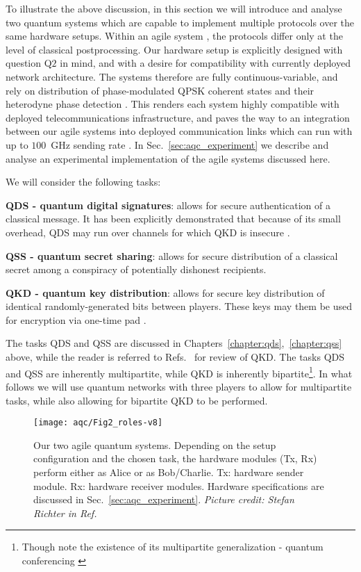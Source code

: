 To illustrate the above discussion, in this section we will introduce and analyse two quantum systems which are capable to implement multiple protocols over the same hardware setups. Within an agile system , the protocols differ only at the level of classical postprocessing. Our hardware setup is explicitly designed with question Q$2$ in mind, and with a desire for compatibility with currently deployed network architecture. The systems therefore are fully continuous-variable, and rely on distribution of phase-modulated QPSK coherent states and their heterodyne phase detection \cite{Agrawal2008}. This renders each system highly compatible with deployed telecommunications infrastructure, and paves the way to an integration between our agile systems into deployed communication links which can run with up to $100$~GHz sending rate \cite{Khan2015, Khan2016}. In Sec.~\ref{sec:aqc_experiment} we describe and analyse an experimental implementation of the agile systems discussed here.

We will consider the following tasks:

\textbf{QDS - quantum digital signatures}: allows for secure authentication of a classical message. It has been explicitly demonstrated that because of its small overhead, QDS may run over channels for which QKD is insecure \cite{Amiri2016}.

\textbf{QSS - quantum secret sharing}: allows for secure distribution of a classical secret among a conspiracy of potentially dishonest recipients.

\textbf{QKD - quantum key distribution}: allows for secure key distribution of identical randomly-generated bits between players. These keys may them be used for encryption via one-time pad \cite{Schneier1996}.

The tasks QDS and QSS are discussed in Chapters~\ref{chapter:qds},~\ref{chapter:qss} above, while the reader is referred to Refs.~\cite{Laudenbach2017, Scarani2009} for review of QKD. The tasks QDS and QSS are inherently multipartite, while QKD is inherently bipartite\footnote{Though note the existence of its multipartite generalization - quantum conferencing \cite{Ottaviani2017b, Ottaviani2019}}. In what follows we will use quantum networks with three players to allow for multipartite tasks, while also allowing for bipartite QKD to be performed.

\begin{figure}[htp]
\captionsetup{width=0.8\linewidth}
\centering
\texttt{[image: aqc/Fig2\_roles-v8]}
\caption{\label{fig:agile_tasks} Our two agile quantum systems. Depending on the setup configuration and the chosen task, the hardware modules (Tx, Rx) perform either as Alice or as Bob/Charlie. Tx: hardware sender module. Rx: hardware receiver modules. Hardware specifications are discussed in Sec.~\ref{sec:aqc_experiment}. \emph{Picture credit: Stefan Richter in Ref.~\cite{Richter2020}}}
\end{figure}

